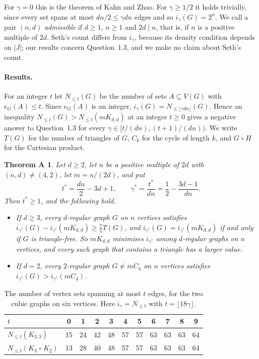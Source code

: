 \documentclass[11pt]{article}
\newtheorem*{thmA}{Theorem A}
\theoremstyle{remark}
\newcommand{\Nle}[1]{N_{\le #1}}
\newcommand{\cart}{\mathbin{\square}}
\begin{document}
For $\gamma=0$ this is the theorem of Kahn and Zhao. For $\gamma\ge1/2$ it
holds trivially, since every set spans at most $dn/2\le\gamma dn$ edges and so
$i_\gamma(G)=2^n$. We call a pair $(n,d)$ \emph{admissible} if $d\ge1$, $n\ge1$ and
$2d\mid n$, that is, if $n$ is a positive multiple of $2d$. Seth's count differs from $i_\gamma$, because its density
condition depends on $|J|$; our results concern Question~1.3, and we make no
claim about Seth's count.

\paragraph{Results.}
For an integer $t$ let $\Nle t(G)$ be the number of sets $A\subseteq V(G)$
with $e_G(A)\le t$. Since $e_G(A)$ is an integer,
$i_\gamma(G)=\Nle{\lfloor\gamma dn\rfloor}(G)$. Hence an inequality
$\Nle t(G)>\Nle t(mK_{d,d})$ at an integer $t\ge0$ gives a negative answer to
Question~1.3 for every $\gamma\in[t/(dn),(t+1)/(dn))$. We write $T(G)$ for
the number of triangles of $G$, $C_k$ for the cycle of length $k$, and
$G\cart H$ for the Cartesian product.

\begin{thmA}
Let $d\ge2$, let $n$ be a positive multiple of $2d$ with $(n,d)\ne(4,2)$, let
$m=n/(2d)$, and put
\[
 t^*=\frac{dn}2-3d+1,\qquad
 \gamma^*=\frac{t^*}{dn}=\frac12-\frac{3d-1}{dn}.
\]
Then $t^*\ge1$, and the following hold.
\begin{itemize}
\item[(a)] If $d\ge3$, every $d$-regular graph $G$ on $n$ vertices satisfies
 $i_{\gamma^*}(G)-i_{\gamma^*}(mK_{d,d})\ge\frac75T(G)$, and
 $i_{\gamma^*}(G)=i_{\gamma^*}(mK_{d,d})$ if and only if $G$ is
 triangle-free. So $mK_{d,d}$ minimises $i_{\gamma^*}$ among $d$-regular graphs
 on $n$ vertices, and every such graph that contains a triangle has a larger
 value.
\item[(b)] If $d=2$, every $2$-regular graph $G\ne mC_4$ on $n$ vertices
 satisfies $i_{\gamma^*}(G)>i_{\gamma^*}(mC_4)$.
\end{itemize}
\end{thmA}

\begin{table}[t]\centering\small
\begin{tabular}{@{}lcccccccccc@{}}\toprule
$t$ & 0 & 1 & 2 & 3 & 4 & 5 & 6 & 7 & 8 & 9\\\midrule
$\Nle t(K_{3,3})$ & 15 & 24 & 42 & 48 & 57 & 57 & 63 & 63 & 63 & 64\\
$\Nle t(K_3\cart K_2)$ & 13 & 28 & 40 & 48 & 57 & 57 & 63 & 63 & 63 & 64\\
\bottomrule
\end{tabular}
\caption{The number of vertex sets spanning at most $t$ edges, for the two
cubic graphs on six vertices. Here $i_\gamma=\Nle t$ with
$t=\lfloor18\gamma\rfloor$.}\label{tab:six}
\end{table}
\end{document}
